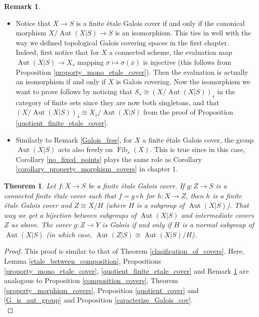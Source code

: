 \documentclass{article}
\theoremstyle{plain}
\newtheorem{theorem}{Theorem}[subsection]
\theoremstyle{definition}
\newtheorem{remark}{Remark}
\DeclareMathOperator{\Fib}{Fib}
\DeclareMathOperator{\Aut}{Aut}
\begin{document}
\begin{remark} \textbf{ }
\label{remark_Galois}
\begin{itemize}
    \item[$a)$] Notice that $X\rightarrow S$ is a finite \'etale Galois cover if and only if the canonical morphism $X/\Aut(X|S) \rightarrow S$ is an isomorphism.
    This ties in well with the way we defined topological Galois covering spaces in the first chapter.\\
    Indeed, first notice that for $X$ a connected scheme, the evaluation map $\Aut(X|S)\rightarrow X_{\overline{s}}$ mapping $\sigma\mapsto\sigma(\overline{x})$ is injective (this follows from Proposition \ref{proporty_mono_etale_cover}).
    Then the evaluation is actually an isomorphism if and only if $X$ is Galois covering. 
    Now the isomorphism we want to prove follows by noticing that $S_{\overline{s}}\cong (X/\Aut(X|S))_{\overline{s}}$ in the category of finite sets since they are now both singletons, and that $(X/\Aut(X|S))_{\overline{s}} \cong X_{\overline{s}}/\Aut(X|S)$ from the proof of Proposition \ref{quotient_finite_etale_cover}.
    \item[$b)$] Similarly to Remark \ref{Galois_free}, for $X$ a finite \'etale Galois cover, the group $\Aut(X|S)$ acts also freely on $\Fib_{\overline{s}}(X)$. This is true since in this case, 
    Corollary \ref{no_fixed_points} plays the same role as Corollary \ref{corollary_property_morphism_covers} in chapter $1$.\\
\end{itemize}
\end{remark}



\begin{theorem}
\label{Galois_correpondance_etale_cov}
    Let $f:X\rightarrow S$ be a finite \'etale Galois cover.
    If $g: Z\rightarrow S$ is a connected finite \'etale cover such that $f = g \circ h$ for $h:X\rightarrow Z$, then $h$ is a finite \'etale Galois cover and $Z\cong X/H$ (where $H$ is a subgroup of $\Aut(X|S)$).
    That way we get a bijection between subgroups of $\Aut(X|S)$ and intermediate covers $Z$ as above.
    The cover $g:Z\rightarrow Y$ is Galois if and only if $H$ is a normal subgroup of $\Aut(X|S)$ (in which case, $\Aut(Z|S) \cong \Aut(X|S) / H$).
\end{theorem}
\begin{proof}
    This proof is similar to that of Theorem \ref{clasification_of_covers}.
    Here, Lemma \ref{etale_between_composition},
    Propositions \ref{proporty_mono_etale_cover}, \ref{quotient_finite_etale_cover} and Remark \ref{remark_Galois}
    are analogous to
    Proposition \ref{composition_covers},
    Theorem \ref{property_morphism_covers},
    Proposition \ref{quotient_cover} and  \ref{G_is_aut_group} and Proposition \ref{caracterize_Galois_cov}.\\
\end{proof}
\end{document}
